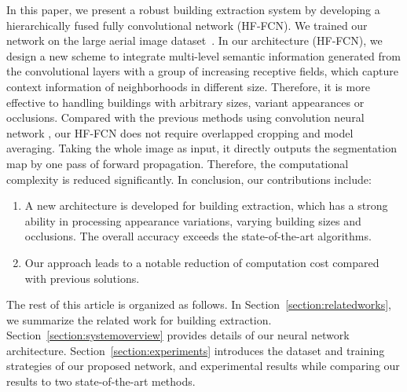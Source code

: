 In this paper, we present a robust building extraction system by developing a hierarchically fused fully convolutional  network (HF-FCN). We trained our network on the large aerial image dataset~\cite{Mnih2013Machine}. In our architecture (HF-FCN), we design a new scheme to integrate multi-level semantic information generated from the convolutional layers with a group of increasing receptive fields, which capture context information of neighborhoods in different size. Therefore, it is more effective to handling buildings with arbitrary sizes, variant appearances or occlusions. Compared with the previous methods using convolution neural network \cite{Mnih2013Machine,Saito2016Multiple}, our HF-FCN does not require overlapped cropping and model averaging. Taking the whole image as input, it directly outputs the segmentation map by one pass of forward propagation. Therefore, the computational complexity is reduced significantly. In conclusion, our contributions include:
\begin{enumerate}
	\item A new architecture is developed for building extraction, which has a strong ability in processing appearance variations, varying building sizes and occlusions. The overall accuracy exceeds the state-of-the-art algorithms. 
	\item Our approach leads to a notable reduction of computation cost compared with previous solutions.
\end{enumerate}  

The rest of this article is organized as follows. In Section~\ref{section:relatedworks}, we summarize the related work for building extraction. Section~\ref{section:systemoverview} provides details of our neural network architecture. Section~\ref{section:experiments} introduces the dataset and training strategies of our proposed network, and experimental results while comparing our results to two state-of-the-art methods. 


